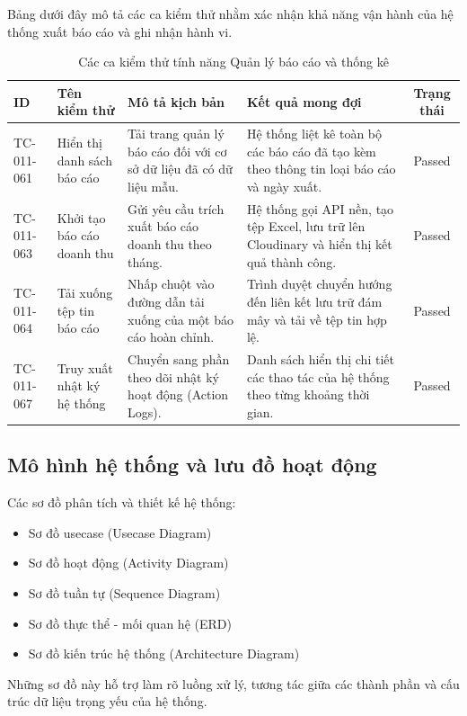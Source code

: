 Bảng dưới đây mô tả các ca kiểm thử nhằm xác nhận khả năng vận hành của hệ thống xuất báo cáo và ghi nhận hành vi.

\begin{table}[H]
\centering
\caption{Các ca kiểm thử tính năng Quản lý báo cáo và thống kê}
\label{tab:tc_report_management}
\small
\begin{tabularx}{\textwidth}{|l|X|X|X|c|}
\hline
\textbf{ID} & \textbf{Tên kiểm thử} & \textbf{Mô tả kịch bản} & \textbf{Kết quả mong đợi} & \textbf{Trạng thái} \\ \hline
TC-011-061 & Hiển thị danh sách báo cáo & Tải trang quản lý báo cáo đối với cơ sở dữ liệu đã có dữ liệu mẫu. & Hệ thống liệt kê toàn bộ các báo cáo đã tạo kèm theo thông tin loại báo cáo và ngày xuất. & Passed \\ \hline
TC-011-063 & Khởi tạo báo cáo doanh thu & Gửi yêu cầu trích xuất báo cáo doanh thu theo tháng. & Hệ thống gọi API nền, tạo tệp Excel, lưu trữ lên Cloudinary và hiển thị kết quả thành công. & Passed \\ \hline
TC-011-064 & Tải xuống tệp tin báo cáo & Nhấp chuột vào đường dẫn tải xuống của một báo cáo hoàn chỉnh. & Trình duyệt chuyển hướng đến liên kết lưu trữ đám mây và tải về tệp tin hợp lệ. & Passed \\ \hline
TC-011-067 & Truy xuất nhật ký hệ thống & Chuyển sang phần theo dõi nhật ký hoạt động (Action Logs). & Danh sách hiển thị chi tiết các thao tác của hệ thống theo từng khoảng thời gian. & Passed \\ \hline
\end{tabularx}
\end{table}


\subsection*{Mô hình hệ thống và lưu đồ hoạt động}
Các sơ đồ phân tích và thiết kế hệ thống:
\begin{itemize}
    \item Sơ đồ usecase (Usecase Diagram)
    \item Sơ đồ hoạt động (Activity Diagram)
    \item Sơ đồ tuần tự (Sequence Diagram)
    \item Sơ đồ thực thể - mối quan hệ (ERD)
    \item Sơ đồ kiến trúc hệ thống (Architecture Diagram)
\end{itemize}

\noindent
Những sơ đồ này hỗ trợ làm rõ luồng xử lý, tương tác giữa các thành phần và cấu trúc dữ liệu trọng yếu của hệ thống.

